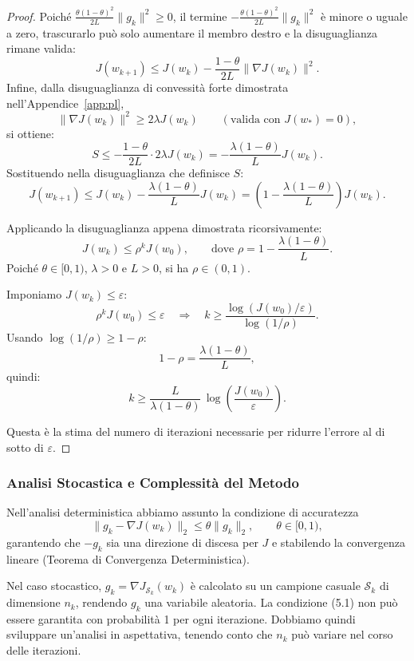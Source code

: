 \documentclass[a4paper,12pt]{article}
\numberwithin{equation}{section}
\numberwithin{figure}{section}
\numberwithin{table}{section}
\begin{document}
\begin{proof}
  Poiché $\frac{\theta(1-\theta)^2}{2L}\|g_k\|^2 \ge 0$, il termine $-\frac{\theta(1-\theta)^2}{2L}\|g_k\|^2$ è minore o uguale a zero, trascurarlo può solo aumentare il membro destro e la disuguaglianza rimane valida:
  \[
  J(w_{k+1}) \le J(w_k) - \frac{1-\theta}{2L}\|\nabla J(w_k)\|^2.
  \]
  Infine, dalla disuguaglianza di convessità forte dimostrata nell'Appendice~\ref{app:pl},
  \[
  \|\nabla J(w_k)\|^2 \ge 2\lambda J(w_k) \qquad (\text{valida con } J(w_*)=0),
  \]
  si ottiene:
\[
S \le -\frac{1-\theta}{2L} \cdot 2\lambda J(w_k)
= -\frac{\lambda(1-\theta)}{L} J(w_k).
\]
Sostituendo nella disuguaglianza che definisce $S$:
\[
J(w_{k+1}) \le J(w_k) - \frac{\lambda(1-\theta)}{L} J(w_k)
= \left(1 - \frac{\lambda(1-\theta)}{L}\right) J(w_k).
\]

Applicando la disuguaglianza appena dimostrata ricorsivamente:
\[
J(w_k) \le \rho^k J(w_0), \qquad \text{dove } \rho = 1 - \frac{\lambda(1-\theta)}{L}.
\]
Poiché $\theta \in [0,1)$, $\lambda > 0$ e $L > 0$, si ha $\rho \in (0,1)$.

Imponiamo $J(w_k) \le \varepsilon$:
\[
\rho^k J(w_0) \le \varepsilon \quad\Longrightarrow\quad k \ge \frac{\log(J(w_0)/\varepsilon)}{\log(1/\rho)}.
\]
Usando $\log(1/\rho) \ge 1-\rho$:
\[
1 - \rho = \frac{\lambda(1-\theta)}{L},
\]
quindi:
\[
k \ge \frac{L}{\lambda(1-\theta)}\,\log\!\left(\frac{J(w_0)}{\varepsilon}\right).
\]

Questa è la stima del numero di iterazioni necessarie per ridurre l'errore al di sotto di $\varepsilon$.
\end{proof}


\subsubsection{Analisi Stocastica e Complessità del Metodo}

Nell'analisi deterministica abbiamo assunto la condizione di accuratezza
\[
\|g_k - \nabla J(w_k)\|_2 \le \theta \|g_k\|_2, \qquad \theta \in [0,1), \tag{5.1}
\]
garantendo che \(-g_k\) sia una direzione di discesa per \(J\) e stabilendo la convergenza lineare (Teorema di Convergenza Deterministica).

Nel caso stocastico, \(g_k = \nabla J_{\mathcal{S}_k}(w_k)\) è calcolato su un campione casuale \(\mathcal{S}_k\) di dimensione \(n_k\), rendendo \(g_k\) una variabile aleatoria. La condizione (5.1) non può essere garantita con probabilità 1 per ogni iterazione. Dobbiamo quindi sviluppare un'analisi in aspettativa, tenendo conto che \(n_k\) può variare nel corso delle iterazioni.
\end{document}
